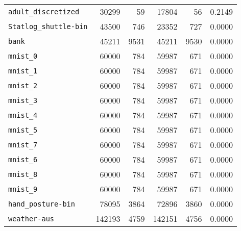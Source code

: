 \begin{tabular}{lrrrrr}
\texttt{adult\_discretized}& 30299& 59& 17804& 56& 0.2149\\
\texttt{Statlog\_shuttle-bin}& 43500& 746& 23352& 727& 0.0000\\
\texttt{bank}& 45211& 9531& 45211& 9530& 0.0000\\
\texttt{mnist\_0}& 60000& 784& 59987& 671& 0.0000\\
\texttt{mnist\_1}& 60000& 784& 59987& 671& 0.0000\\
\texttt{mnist\_2}& 60000& 784& 59987& 671& 0.0000\\
\texttt{mnist\_3}& 60000& 784& 59987& 671& 0.0000\\
\texttt{mnist\_4}& 60000& 784& 59987& 671& 0.0000\\
\texttt{mnist\_5}& 60000& 784& 59987& 671& 0.0000\\
\texttt{mnist\_7}& 60000& 784& 59987& 671& 0.0000\\
\texttt{mnist\_6}& 60000& 784& 59987& 671& 0.0000\\
\texttt{mnist\_8}& 60000& 784& 59987& 671& 0.0000\\
\texttt{mnist\_9}& 60000& 784& 59987& 671& 0.0000\\
\texttt{hand\_posture-bin}& 78095& 3864& 72896& 3860& 0.0000\\
\texttt{weather-aus}& 142193& 4759& 142151& 4756& 0.0000\\
\bottomrule
\end{tabular}
